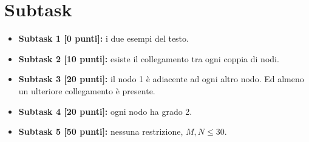   \section*{Subtask}
  \begin{itemize}
    \item \textbf{Subtask 1 [0 punti]:} i due esempi del testo.
    \item \textbf{Subtask 2 [10 punti]:} esiste il collegamento tra ogni coppia di nodi.
    \item \textbf{Subtask 3 [20 punti]:} il nodo 1 \`e adiacente ad ogni altro nodo. Ed almeno un ulteriore collegamento \`e presente.
    \item \textbf{Subtask 4 [20 punti]:} ogni nodo ha grado 2.
    \item \textbf{Subtask 5 [50 punti]:} nessuna restrizione, $M,N \leq 30$.
  \end{itemize}
  



